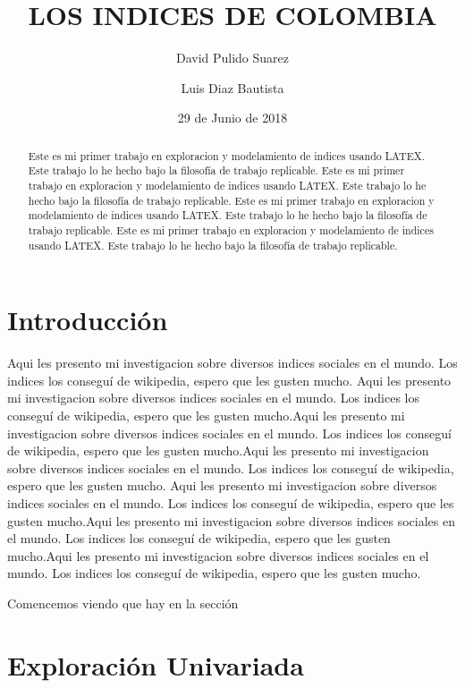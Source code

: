 \documentclass{article}
\title{LOS INDICES DE COLOMBIA}
\author[1]{\normalsize David Pulido Suarez}
\author[2]{\normalsize Luis Diaz Bautista}
\affil[1,2]{\small  Facultad de Ingeniería,Universidad de los Andes\\
\texttt{{ds.pulido10,lc.diaz12}@uniandes.edu.col}}
\date{29 de Junio de 2018}
\begin{document}


\maketitle


\begin{abstract}
Este es mi primer trabajo en exploracion y modelamiento de indices usando LATEX. Este trabajo lo he hecho bajo la filosofía de trabajo replicable. Este es mi primer trabajo en exploracion y modelamiento de indices usando LATEX. Este trabajo lo he hecho bajo la filosofía de trabajo replicable. Este es mi primer trabajo en exploracion y modelamiento de indices usando LATEX. Este trabajo lo he hecho bajo la filosofía de trabajo replicable. Este es mi primer trabajo en exploracion y modelamiento de indices usando LATEX. Este trabajo lo he hecho bajo la filosofía de trabajo replicable.
\end{abstract}

\section*{Introducción}

Aqui les presento mi investigacion sobre diversos indices sociales en el mundo. Los indices los conseguí de wikipedia, espero que les gusten mucho. Aqui les presento mi investigacion sobre diversos indices sociales en el mundo. Los indices los conseguí de wikipedia, espero que les gusten mucho.Aqui les presento mi investigacion sobre diversos indices sociales en el mundo. Los indices los conseguí de wikipedia, espero que les gusten mucho.Aqui les presento mi investigacion sobre diversos indices sociales en el mundo. Los indices los conseguí de wikipedia, espero que les gusten mucho.
Aqui les presento mi investigacion sobre diversos indices sociales en el mundo. Los indices los conseguí de wikipedia, espero que les gusten mucho.Aqui les presento mi investigacion sobre diversos indices sociales en el mundo. Los indices los conseguí de wikipedia, espero que les gusten mucho.Aqui les presento mi investigacion sobre diversos indices sociales en el mundo. Los indices los conseguí de wikipedia, espero que les gusten mucho.

Comencemos viendo que hay en la sección %

\clearpage



\section{Exploración Univariada}\label{univariada}
\end{document}
